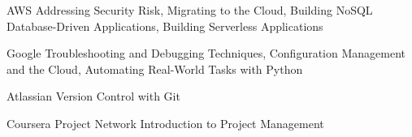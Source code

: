 

\begin{cvskills}

  \cvskill
    {AWS} %
    {Addressing Security Risk, Migrating to the Cloud, Building NoSQL Database-Driven Applications, Building Serverless Applications} %
    
  \cvskill
    {Google} %
    {Troubleshooting and Debugging Techniques, Configuration Management and the Cloud, Automating Real-World Tasks with Python} %

  \cvskill
    {Atlassian} %
    {Version Control with Git} %
    
  \cvskill
    {Coursera Project Network} %
    {Introduction to Project Management} %

\end{cvskills}
